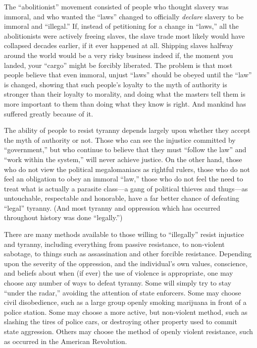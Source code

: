 \documentclass{book}
\begin{document}
The \enquote{abolitionist} movement consisted of people who thought slavery was immoral, and who wanted the \enquote{laws} changed to officially \emph{declare} slavery to be immoral and \enquote{illegal.} If, instead of petitioning for a change in \enquote{laws,} all the abolitionists were actively freeing slaves, the slave trade most likely would have collapsed decades earlier, if it ever happened at all. Shipping slaves halfway around the world would be a very risky business indeed if, the moment you landed, your \enquote{cargo} might be forcibly liberated. The problem is that most people believe that even immoral, unjust \enquote{laws} should be obeyed until the \enquote{law} is changed, showing that such people's loyalty to the myth of authority is stronger than their loyalty to morality, and doing what the masters tell them is more important to them than doing what they know is right. And mankind has suffered greatly because of it.

The ability of people to resist tyranny depends largely upon whether they accept the myth of authority or not. Those who can see the injustice committed by \enquote{government,} but who continue to believe that they must \enquote{follow the law} and \enquote{work within the system,} will never achieve justice. On the other hand, those who do not view the political megalomaniacs as rightful rulers, those who do not feel an obligation to obey an immoral \enquote{law,} those who do not feel the need to treat what is actually a parasite class---a gang of political thieves and thugs---as untouchable, respectable and honorable, have a far better chance of defeating \enquote{legal} tyranny. (And most tyranny and oppression which has occurred throughout history was done \enquote{legally.})

There are many methods available to those willing to \enquote{illegally} resist injustice and tyranny, including everything from passive resistance, to non-violent sabotage, to things such as assassination and other forcible resistance. Depending upon the severity of the oppression, and the individual's own values, conscience, and beliefs about when (if ever) the use of violence is appropriate, one may choose any number of ways to defeat tyranny. Some will simply try to stay \enquote{under the radar,} avoiding the attention of state enforcers. Some may choose civil disobedience, such as a large group openly smoking marijuana in front of a police station. Some may choose a more active, but non-violent method, such as slashing the tires of police cars, or destroying other property used to commit state aggression. Others may choose the method of openly violent resistance, such as occurred in the American Revolution.
\end{document}
